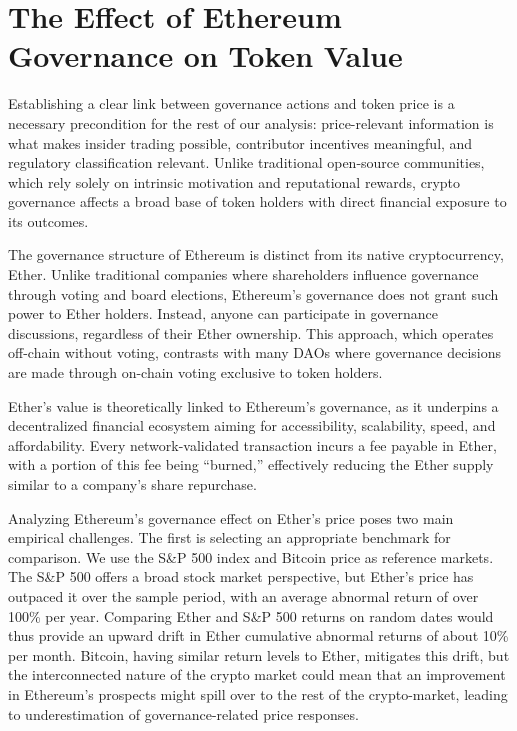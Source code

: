\documentclass[No]{AEA}
\begin{document}
\section{The Effect of Ethereum Governance on Token Value}

Establishing a clear link between governance actions and token price is a necessary precondition for the rest of our analysis: price-relevant information is what makes insider trading possible, contributor incentives meaningful, and regulatory classification relevant. Unlike traditional open-source communities, which rely solely on intrinsic motivation and reputational rewards, crypto governance affects a broad base of token holders with direct financial exposure to its outcomes. 

The governance structure of Ethereum is distinct from its native cryptocurrency, Ether. Unlike traditional companies where shareholders influence governance through voting and board elections, Ethereum's governance does not grant such power to Ether holders. Instead, anyone can participate in governance discussions, regardless of their Ether ownership. This approach, which operates off-chain without voting, contrasts with many DAOs where governance decisions are made through on-chain voting exclusive to token holders.

Ether's value is theoretically linked to Ethereum's governance, as it underpins a decentralized financial ecosystem aiming for accessibility, scalability, speed, and affordability. Every network-validated transaction incurs a fee payable in Ether, with a portion of this fee being ``burned,'' effectively reducing the Ether supply similar to a company's share repurchase. 

Analyzing Ethereum's governance effect on Ether's price poses two main empirical challenges. The first is selecting an appropriate benchmark for comparison. We use the S\&P 500 index and Bitcoin price as reference markets. The S\&P 500 offers a broad stock market perspective, but Ether's price has outpaced it over the sample period, with an average abnormal return of over 100\% per year. Comparing Ether and S\&P 500 returns on random dates would thus provide an upward drift in Ether cumulative abnormal returns of about 10\% per month. Bitcoin, having similar return levels to Ether, mitigates this drift, but the interconnected nature of the crypto market could mean that an improvement in Ethereum's prospects might spill over to the rest of the crypto-market, leading to underestimation of governance-related price responses.
\end{document}
